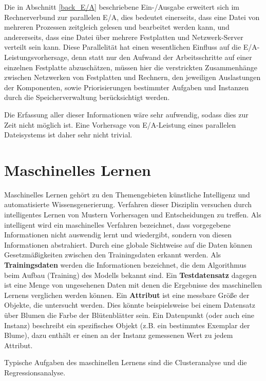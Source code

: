 \documentclass[
	twoside,
	12pt,
	a4paper,
	BCOR10mm,
	DIV14,
	listof=totoc,
	bibliography=totoc,
	headsepline
]{scrreprt}
\begin{document}
Die in Abschnitt \ref{back_E/A} beschriebene Ein-/Ausgabe erweitert sich im Rechnerverbund zur parallelen E/A, dies bedeutet einerseits, dass eine Datei von mehreren Prozessen zeitgleich gelesen und bearbeitet werden kann, und andererseits, dass eine Datei über mehrere Festplatten und Netzwerk-Server verteilt sein kann. Diese Parallelität hat einen wesentlichen Einfluss auf die E/A-Leistungsvorhersage, denn statt nur den Aufwand der Arbeitsschritte auf einer einzelnen Festplatte abzuschätzen, müssen hier die verstrickten Zusammenhänge zwischen Netzwerken von Festplatten und Rechnern, den jeweiligen Auslastungen der Komponenten, sowie Priorisierungen bestimmter Aufgaben und Instanzen durch die Speicherverwaltung berücksichtigt werden.

Die Erfassung aller dieser Informationen wäre sehr aufwendig, sodass dies zur Zeit nicht möglich ist. Eine Vorhersage von E/A-Leistung eines parallelen Dateisystems ist daher sehr nicht trivial.

\section{Maschinelles Lernen}
\label{back_ML}
Maschinelles Lernen gehört zu den Themengebieten künstliche Intelligenz und automatisierte Wissensgenerierung. Verfahren dieser Disziplin versuchen durch intelligentes Lernen von Mustern Vorhersagen und Entscheidungen zu treffen.
Als intelligent wird ein maschinelles Verfahren bezeichnet, dass vorgegebene Informationen nicht auswendig lernt und wiedergibt, sondern von diesen Informationen abstrahiert.
Durch eine globale Sichtweise auf die Daten können Gesetzmäßigkeiten zwischen den Trainingsdaten erkannt werden.
Als \textbf{Trainingsdaten} werden die Informationen bezeichnet, die dem Algorithmus beim Aufbau (Training) des Modells bekannt sind.
Ein \textbf{Testdatensatz} dagegen ist eine Menge von ungesehenen Daten mit denen die Ergebnisse des maschinellen Lernens verglichen werden können.
Ein \textbf{Attribut} ist eine messbare Größe der Objekte, die untersucht werden. Dies könnte beispielsweise bei einem Datensatz über Blumen die Farbe der Blütenblätter sein.
Ein Datenpunkt (oder auch eine Instanz) beschreibt ein spezifisches Objekt (z.B. ein bestimmtes Exemplar der Blume), dazu enthält er einen an der Instanz gemessenen Wert zu jedem Attribut.

Typische Aufgaben des maschinellen Lernens sind die Clusteranalyse und die Regressionsanalyse.
\end{document}
